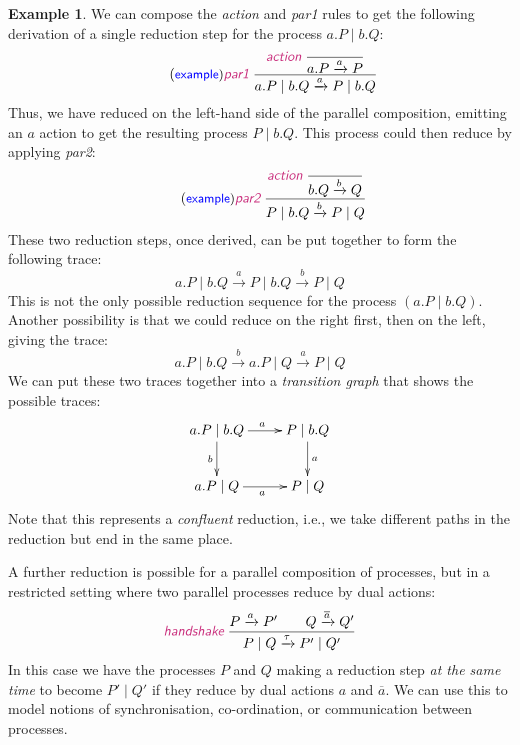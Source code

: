 \documentclass{article}
\newcommand{\exampleLabel}{\tag{\small{\textcolor{blue}{\textsf{example}}}}}
\theoremstyle{definition}
\newtheorem{example}{Example}
\newcommand{\trule}[1]{\textcolor{labelColor}{\textit{\textsf{#1}}}\;}
\begin{document}
\begin{example}
We can compose the \trule{action} and \trule{par1}
rules to get the following derivation of a single reduction
step for the process $a . P \mid b . Q$:
%
\begin{align*}
  \exampleLabel{}
  \trule{par1}\dfrac{\trule{action}
  \dfrac{}{a.P \xrightarrow{a} P}}{a.P \mid b.Q \xrightarrow{a} P \mid b.Q}
\end{align*}
%
Thus, we have reduced on the left-hand side of the parallel
composition, emitting an $a$ action to get the resulting process $P
\mid b . Q$. This process could then reduce by applying \trule{par2}:
%
\begin{align*}
  \exampleLabel{}
  \trule{par2}\dfrac{\trule{action}
   \dfrac{}{b.Q \xrightarrow{b} Q}}{P \mid b.Q \xrightarrow{b} P \mid Q}
\end{align*}
%
These two reduction steps, once derived, can be put together to form
the following trace:
%
\begin{equation*}
a.P \mid b.Q \xrightarrow{a} P \mid b.Q \xrightarrow{b} P \mid Q
\end{equation*}
%
This is not the only possible reduction sequence for
the process $(a.P \mid b.Q)$. Another possibility is that we could
reduce on the right first, then on the left, giving the trace:
%
\begin{equation*}
a.P \mid b.Q \xrightarrow{b} a.P \mid Q \xrightarrow{a} P \mid Q
\end{equation*}
%
We can put these two traces together into a \emph{transition graph} that shows
the possible traces:
%
\begin{equation*}
  \xymatrix{
    a.P \mid b.Q \ar[r]^{a} \ar[d]_-{b} & P \mid b.Q \ar[d]^-{a} \\
    a.P \mid Q \ar[r]_{a} & P \mid Q
    }
\end{equation*}
%
Note that this represents a \emph{confluent} reduction, i.e., we take
different paths in the reduction but end in the same place.
\end{example}

A further reduction is possible for a parallel composition of processes,
but in a restricted setting where two parallel processes reduce
by dual actions:
%
\begin{align*}
  \trule{handshake}\dfrac{P \xrightarrow{a} P' \qquad Q \xrightarrow{\overline{a}} Q'}
  {P \mid Q \xrightarrow{\tau} P' \mid Q'}
\end{align*}
%
In this case we have the processes $P$ and $Q$ making a reduction step
\emph{at the same time} to become $P' \mid Q'$ if they reduce by dual
actions $a$ and $\overline{a}$. We can use this to model notions of
synchronisation, co-ordination, or communication between processes.
\end{document}

